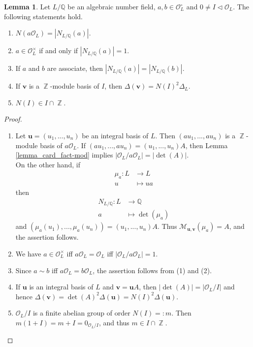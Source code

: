 \documentclass[12pt,a4paper]{report}
\theoremstyle{definition}
\newtheorem{lemma}[theorem]{Lemma}
\theoremstyle{num.custom-title}
\DeclareMathOperator{\Z}{\mathbb{Z}}
\newcommand{\M}{\mathcal{M}}
\newcommand{\Q}{\mathbb{Q}}
\renewcommand{\O}{\mathcal{O}}
\renewcommand{\u}{\mathbf{u}}
\begin{document}
\begin{lemma}
Let $L/\Q$ be an algebraic number field, $a,b \in \O_L^\circ$ and $0 \neq I \lhd \O_L$. The following statements hold.
\begin{enumerate}
\item $N(a\O_L) = |N_{L/\Q}(a)|$.
\item $a \in \O_L^\times$ if and only if $|N_{L/\Q}(a)|=1$.
\item If $a$ and $b$ are associate, then $|N_{L/\Q}(a)|=|N_{L/\Q}(b)|$.
\item If $\mathbf{v}$ is a $\Z$-module basis of $I$, then $\Delta(\mathbf{v}) = N(I)^2 \Delta_L$.
\item $N(I) \in I \cap \Z$.
\end{enumerate}
\begin{proof}\ 
\begin{enumerate}
\item Let $\u = (u_1,...,u_n)$ be an integral basis of $L$. Then $(a u_1,...,a u_n)$ is a $\Z$-module basis of $a\O_L$. If $(a u_1,...,a u_n) = (u_1,...,u_n) A$, then Lemma \ref{lemma_card_fact-mod} implies $|\O_L/a\O_L| = |\det(A)|$.\\
On the other hand, if
\begin{align*}
\mu_a \colon L &\to L \\
u &\mapsto ua
\end{align*}
then
\begin{align*}
N_{L/\Q} \colon L &\to \Q \\
a &\mapsto \det(\mu_a)
\end{align*}
and $(\mu_a(u_1),...,\mu_a(u_n)) = (u_1,...,u_n)A$. Thus $\M_{\u,\mathbf{v}}(\mu_a) = A$, and the assertion follows.
\item We have $a \in \O_L^\times$ iff $a\O_L = \O_L$ iff $|\O_L/a\O_L|=1$.
\item Since $a \sim b$ iff $a\O_L=b\O_L$, the assertion follows from (1) and (2).
\item If $\u$ is an integral basis of $L$ and $\mathbf{v} = \u A$, then $|\det(A)| = |\O_L/I|$ and hence $\Delta(\mathbf{v}) = \det(A)^2 \Delta(\u) = N(I)^2 \Delta(\u)$.
\item $\O_L/I$ is a finite abelian group of order $N(I)=:m$. Then $m(1+I)=m+I=0_{\O_L/I}$, and thus $m \in I \cap \Z$.
\end{enumerate}
\end{proof}
\end{lemma}
\end{document}
